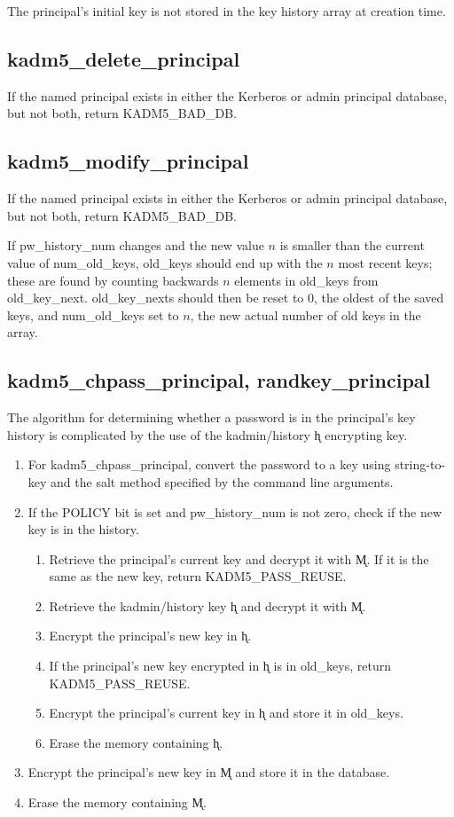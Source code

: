 The principal's initial key is not stored in the key history array at
creation time.

\subsection{kadm5_delete_principal}

If the named principal exists in either the Kerberos or admin
principal database, but not both, return KADM5_BAD_DB.

\subsection{kadm5_modify_principal}

If the named principal exists in either the Kerberos or admin
principal database, but not both, return KADM5_BAD_DB.

If pw_history_num changes and the new value $n$ is smaller than the
current value of num_old_keys, old_keys should end up with the $n$
most recent keys; these are found by counting backwards $n$ elements
in old_keys from old_key_next.  old_key_nexts should then be reset to
0, the oldest of the saved keys, and num_old_keys set to $n$, the
new actual number of old keys in the array.  

\subsection{kadm5_chpass_principal, randkey_principal}

The algorithm for determining whether a password is in the principal's
key history is complicated by the use of the kadmin/history \k{h}
encrypting key.  

\begin{enumerate}
\item For kadm5_chpass_principal, convert the password to a key
using string-to-key and the salt method specified by the command line
arguments.

\item If the POLICY bit is set and pw_history_num is not zero, check
if the new key is in the history.
\begin{enumerate}
\item Retrieve the principal's current key and decrypt it with \k{M}.
If it is the same as the new key, return KADM5_PASS_REUSE.
\item Retrieve the kadmin/history key \k{h} and decrypt it with \k{M}.
\item Encrypt the principal's new key in \k{h}.
\item If the principal's new key encrypted in \k{h} is in old_keys,
return KADM5_PASS_REUSE.
\item Encrypt the principal's current key in \k{h} and store it in
old_keys.
\item Erase the memory containing \k{h}.
\end{enumerate}

\item Encrypt the principal's new key in \k{M} and store it in the
database.
\item Erase the memory containing \k{M}.
\end{enumerate}

